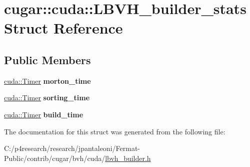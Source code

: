 \hypertarget{structcugar_1_1cuda_1_1_l_b_v_h__builder__stats}{}\section{cugar\+:\+:cuda\+:\+:L\+B\+V\+H\+\_\+builder\+\_\+stats Struct Reference}
\label{structcugar_1_1cuda_1_1_l_b_v_h__builder__stats}
\subsection*{Public Members}
\begin{DoxyCompactItemize}
\item 
\mbox{\label{structcugar_1_1cuda_1_1_l_b_v_h__builder__stats_a59e8e92157beb5a22f9bae9edafcfd66}} 
\hyperlink{structcugar_1_1cuda_1_1_timer}{cuda\+::\+Timer} {\bfseries morton\+\_\+time}
\item 
\mbox{\label{structcugar_1_1cuda_1_1_l_b_v_h__builder__stats_a40cbf3e6917046bcac4dc0da3ab304d8}} 
\hyperlink{structcugar_1_1cuda_1_1_timer}{cuda\+::\+Timer} {\bfseries sorting\+\_\+time}
\item 
\mbox{\label{structcugar_1_1cuda_1_1_l_b_v_h__builder__stats_a61c7c86c73d67ea5f8247d8063ae8bf6}} 
\hyperlink{structcugar_1_1cuda_1_1_timer}{cuda\+::\+Timer} {\bfseries build\+\_\+time}
\end{DoxyCompactItemize}


The documentation for this struct was generated from the following file\+:\begin{DoxyCompactItemize}
\item 
C\+:/p4research/research/jpantaleoni/\+Fermat-\/\+Public/contrib/cugar/bvh/cuda/\hyperlink{lbvh__builder_8h}{lbvh\+\_\+builder.\+h}\end{DoxyCompactItemize}
